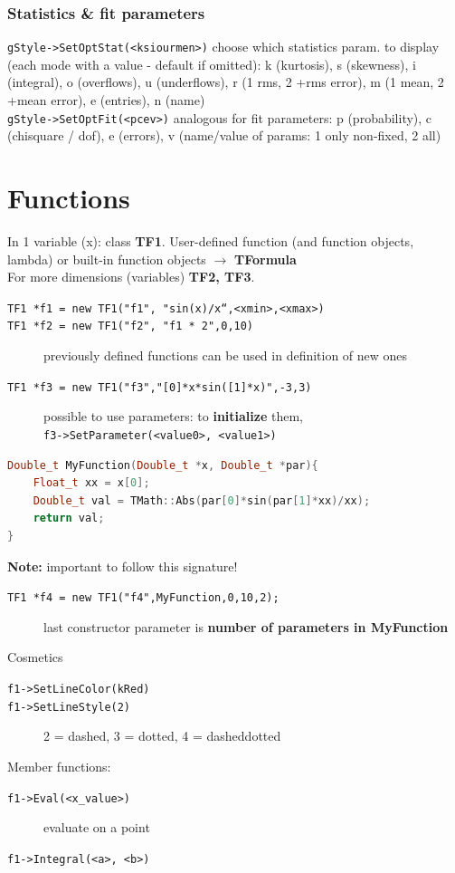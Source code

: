 \documentclass[10pt, oneside]{article}
\begin{document}
\subsubsection{Statistics \& fit parameters}
\texttt{gStyle->SetOptStat(<ksiourmen>)} choose which statistics param. to display (each mode with a value - default if omitted): k (kurtosis), s (skewness), i (integral), o (overflows), u (underflows), r (1 rms, 2 +rms error), m (1 mean, 2  +mean error), e (entries), n (name) 
\\\texttt{gStyle->SetOptFit(<pcev>)} analogous for fit parameters: p (probability), c (chisquare / dof), e (errors), v (name/value of params: 1 only non-fixed, 2 all)

\section{Functions}
In 1 variable (x): class \textbf{TF1}. User-defined function (and function objects, lambda) or built-in function objects $\rightarrow$ \textbf{TFormula}
\\For more dimensions (variables) \textbf{TF2, TF3}.
\begin{description}
\item[\texttt{TF1 *f1 = new TF1("f1", "sin(x)/x“,<xmin>,<xmax>)}]
\item[\texttt{TF1 *f2 = new TF1("f2", "f1 * 2",0,10)}] previously defined functions can be used in definition of new ones
\item[\texttt{TF1 *f3 = new TF1("f3","[0]*x*sin([1]*x)",-3,3)}] possible to use parameters: to \textbf{initialize} them, \\\texttt{f3->SetParameter(<value0>, <value1>)}
\end{description}
\begin{lstlisting}[language=C++]
Double_t MyFunction(Double_t *x, Double_t *par){ 
	Float_t xx = x[0];
	Double_t val = TMath::Abs(par[0]*sin(par[1]*xx)/xx); 
	return val;
}
\end{lstlisting}
\textbf{Note:} important to follow this signature!
\begin{description}
\item[\texttt{TF1 *f4 = new TF1("f4",MyFunction,0,10,2);}] last constructor parameter is \textbf{number of parameters in MyFunction}
\end{description}
Cosmetics
\begin{description}
\item[\texttt{f1->SetLineColor(kRed)}]
\item[\texttt{f1->SetLineStyle(2)}] 2 = dashed, 3 = dotted, 4 = dasheddotted
\end{description}
Member functions:
\begin{description}
\item[\texttt{f1->Eval(<x\_value>)}] evaluate on a point
\item[\texttt{f1->Integral(<a>, <b>)}]
\end{description}
\end{document}
